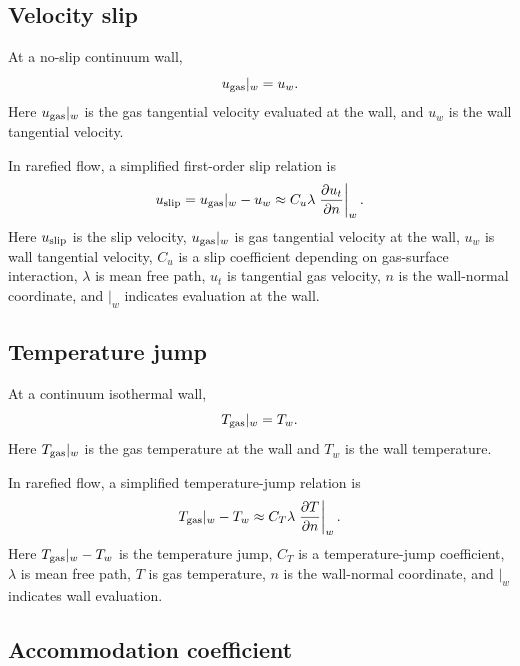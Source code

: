 \documentclass[11pt]{article}
\begin{document}
\subsection{Velocity slip}

At a no-slip continuum wall,
\begin{equation}
    u_{\rm gas}|_w = u_w.
    \label{eq:no_slip}
\end{equation}
Here $u_{\rm gas}|_w$ is the gas tangential velocity evaluated at the wall, and $u_w$ is the wall tangential velocity.

In rarefied flow, a simplified first-order slip relation is
\begin{equation}
    u_{\rm slip}=u_{\rm gas}|_w-u_w \approx C_u\lambda\left.\frac{\partial u_t}{\partial n}\right|_w.
    \label{eq:slip}
\end{equation}
Here $u_{\rm slip}$ is the slip velocity, $u_{\rm gas}|_w$ is gas tangential velocity at the wall, $u_w$ is wall tangential velocity, $C_u$ is a slip coefficient depending on gas-surface interaction, $\lambda$ is mean free path, $u_t$ is tangential gas velocity, $n$ is the wall-normal coordinate, and $|_w$ indicates evaluation at the wall.

\subsection{Temperature jump}

At a continuum isothermal wall,
\begin{equation}
    T_{\rm gas}|_w = T_w.
    \label{eq:no_jump}
\end{equation}
Here $T_{\rm gas}|_w$ is the gas temperature at the wall and $T_w$ is the wall temperature.

In rarefied flow, a simplified temperature-jump relation is
\begin{equation}
    T_{\rm gas}|_w-T_w \approx C_T\lambda\left.\frac{\partial T}{\partial n}\right|_w.
    \label{eq:temperature_jump}
\end{equation}
Here $T_{\rm gas}|_w-T_w$ is the temperature jump, $C_T$ is a temperature-jump coefficient, $\lambda$ is mean free path, $T$ is gas temperature, $n$ is the wall-normal coordinate, and $|_w$ indicates wall evaluation.

\subsection{Accommodation coefficient}
\end{document}
